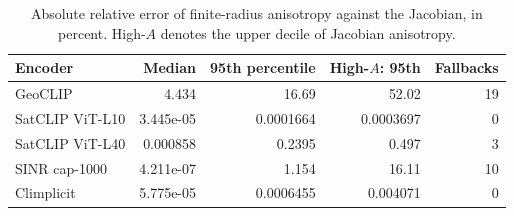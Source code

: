 \begin{table}[htbp]\centering\small
\caption{Absolute relative error of finite-radius anisotropy against the Jacobian, in percent. High-$A$ denotes the upper decile of Jacobian anisotropy.}
\label{tab:tails}
\begin{tabular}{@{}lrrrr@{}}
\toprule
Encoder&Median&95th percentile&High-$A$: 95th&Fallbacks\\\midrule
GeoCLIP&4.434&16.69&52.02&19\\
SatCLIP ViT-L10&3.445e-05&0.0001664&0.0003697&0\\
SatCLIP ViT-L40&0.000858&0.2395&0.497&3\\
SINR cap-1000&4.211e-07&1.154&16.11&10\\
Climplicit&5.775e-05&0.0006455&0.004071&0\\
\bottomrule\end{tabular}

\end{table}
